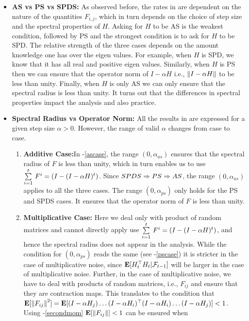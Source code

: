 \begin{itemize}[leftmargin=*]
\item \textbf{AS vs PS vs SPDS:} As observed before, the rates in  are dependent on the nature of the quantities $F_{i,j}$, which in turn depends on the choice of step size and the spectral properties of $H$. Asking for $H$ to be AS is the weakest condition, followed by PS and the strongest condition is to ask for $H$ to be SPD. The relative strength of the three cases depends on the amount knowledge one has over the eigen values. For example, when $H$ is SPD, we know that it has all real and positive eigen values. Similarly, when $H$ is PS then we can ensure that the operator norm of $I-\alpha H$ i.e., $\norm{I-\alpha H}$ to be less than unity. Finally, when $H$ is only AS we can only ensure that the spectral radius is less than unity. It turns out that the differences in spectral properties impact the analysis and also practice.
\item \textbf{Spectral  Radius vs Operator Norm:} All the results in  are expressed for a given step size $\alpha>0$. However, the range of valid $\alpha$ changes from case to case.
\begin{enumerate}
\item \textbf{Additive Case:}In -\ref{ascase}, the range $(0,\alpha_{as})$ ensures that the spectral radius of $F$ is less than unity, which in turn enables us to use $\ous{\sum}{i=1}{t}F^{i}=(I-(I-\alpha H)^t)$. Since $SPDS \Ra PS \Ra AS$, the range $(0,\alpha_{as})$ applies to all the three cases. The range $(0,\alpha_{ps})$ only holds for the PS and SPDS cases. It ensures that the operator norm of $F$ is less than unity.
\item \textbf{Multiplicative Case:} Here we deal only with product of random matrices and cannot directly apply use  $\ous{\sum}{i=1}{t}F^{i}=(I-(I-\alpha H)^t)$, and hence the spectral radius does not appear in the analysis. While the condition for $(0,\alpha_{ps})$ reads the same (see -\ref{pscase}) it is stricter in the case of multiplicative noise, since $\E[H^\top_t H_t|\F_{t-1}]$ will be larger in the case of multiplicative noise.  Further, in the case of multiplicative noise, we have to deal with products of random matrices, i.e., $F_{ij}$ and ensure that they are contraction maps. This translates to the condition that $\E[\norm{F_{ij}}^2]= \E[(I-\alpha H_j)\ldots (I-\alpha H_i)^\top (I-\alpha H_i) \ldots (I-\alpha H_j)]<1$. Using -\ref{secondmom}  $\E[\norm{F_{ij}}]<1$ can be ensured when
\begin{align}\label{mulcond}

\end{align}
\end{enumerate}
\end{itemize}
